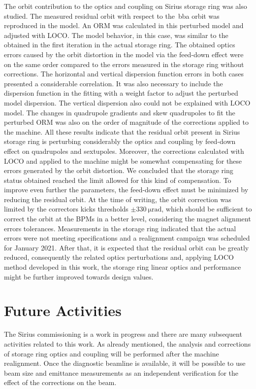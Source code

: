 The orbit contribution to the optics and coupling on Sirius storage ring was also studied. The measured residual orbit with respect to the~\gls{bba} orbit was reproduced in the model. An ORM was calculated in this perturbed model and adjusted with LOCO. The model behavior, in this case, was similar to the obtained in the first iteration in the actual storage ring. The obtained optics errors caused by the orbit distortion in the model via the feed-down effect were on the same order compared to the errors measured in the storage ring without corrections. The horizontal and vertical dispersion function errors in both cases presented a considerable correlation. It was also necessary to include the dispersion function in the fitting with a weight factor to adjust the perturbed model dispersion. The vertical dispersion also could not be explained with LOCO model. The changes in quadrupole gradients and skew quadrupoles to fit the perturbed ORM was also on the order of magnitude of the corrections applied to the machine. All these results indicate that the residual orbit present in Sirius storage ring is perturbing considerably the optics and coupling by feed-down effect on quadrupoles and sextupoles. Moreover, the corrections calculated with LOCO and applied to the machine might be somewhat compensating for these errors generated by the orbit distortion. We concluded that the storage ring status obtained reached the limit allowed for this kind of compensation. To improve even further the parameters, the feed-down effect must be minimized by reducing the residual orbit. At the time of writing, the orbit correction was limited by the correctors kicks thresholds $\pm\SI{330}{\micro\radian}$, which should be sufficient to correct the orbit at the BPMs in a better level, considering the magnet alignment errors tolerances. Measurements in the storage ring indicated that the actual errors were not meeting specifications and a realignment campaign was scheduled for January 2021. After that, it is expected that the residual orbit can be greatly reduced, consequently the related optics perturbations and, applying LOCO method developed in this work, the storage ring linear optics and performance might be further improved towards design values. 
\section*{Future Activities}
The Sirius commissioning is a work in progress and there are many subsequent activities related to this work. As already mentioned, the analysis and corrections of storage ring optics and coupling will be performed after the machine realignment. Once the diagnostic beamline is available, it will be possible to use beam size and emittance measurements as an independent verification for the effect of the corrections on the beam. 

